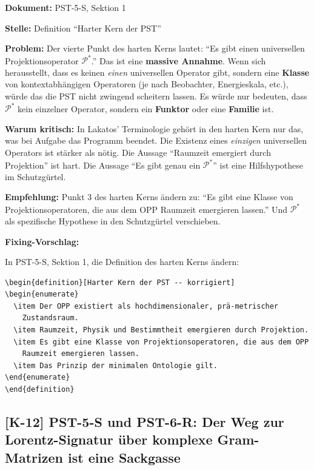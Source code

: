 \documentclass[11pt,a4paper]{article}
\newcommand{\K}[1]{\textbf{[K-#1]}}
\newcommand{\Dok}[1]{\noindent\textbf{Dokument:} #1\par\smallskip}
\newcommand{\Stelle}[1]{\noindent\textbf{Stelle:} #1\par\smallskip}
\newcommand{\Prob}[1]{\noindent\textbf{Problem:} #1\par\smallskip}
\newcommand{\Krit}[1]{\noindent\textbf{Warum kritisch:} #1\par\smallskip}
\newcommand{\Empf}[1]{\noindent\textbf{Empfehlung:} #1\par\smallskip}
\newenvironment{Fix}
  {\par\medskip\noindent\textbf{Fixing-Vorschlag:}\par\nobreak\smallskip}
  {\par\medskip}
\begin{document}
\Dok{PST-5-S, Sektion 1}
\Stelle{Definition ``Harter Kern der PST''}
\Prob{Der vierte Punkt des harten Kerns lautet: ``Es gibt einen
universellen Projektionsoperator $\mathcal{P}^*$.'' Das ist eine
\textbf{massive Annahme}. Wenn sich herausstellt, dass es keinen
\emph{einen} universellen Operator gibt, sondern eine \textbf{Klasse}
von kontextabhängigen Operatoren (je nach Beobachter, Energieskala,
etc.), würde das die PST nicht zwingend scheitern lassen. Es
würde nur bedeuten, dass $\mathcal{P}^*$ kein einzelner Operator,
sondern ein \textbf{Funktor} oder eine \textbf{Familie} ist.}
\Krit{In Lakatos' Terminologie gehört in den harten Kern nur das,
was bei Aufgabe das Programm beendet. Die Existenz eines \emph{einzigen}
universellen Operators ist stärker als nötig. Die Aussage
``Raumzeit emergiert durch Projektion'' ist hart. Die Aussage ``Es
gibt genau ein $\mathcal{P}^*$'' ist eine Hilfshypothese im
Schutzgürtel.}
\Empf{Punkt 3 des harten Kerns ändern zu: ``Es gibt eine Klasse von
Projektionsoperatoren, die aus dem OPP Raumzeit emergieren lassen.''
Und $\mathcal{P}^*$ als spezifische Hypothese in den Schutzgürtel
verschieben.}
\begin{Fix}
In PST-5-S, Sektion 1, die Definition des harten Kerns
ändern:
\begin{verbatim}
\begin{definition}[Harter Kern der PST -- korrigiert]
\begin{enumerate}
  \item Der OPP existiert als hochdimensionaler, prä-metrischer
    Zustandsraum.
  \item Raumzeit, Physik und Bestimmtheit emergieren durch Projektion.
  \item Es gibt eine Klasse von Projektionsoperatoren, die aus dem OPP
    Raumzeit emergieren lassen.
  \item Das Prinzip der minimalen Ontologie gilt.
\end{enumerate}
\end{definition}
\end{verbatim}
\end{Fix}

\subsection{\K{12} PST-5-S und PST-6-R: Der Weg zur Lorentz-Signatur über
komplexe Gram-Matrizen ist eine Sackgasse}
\end{document}
